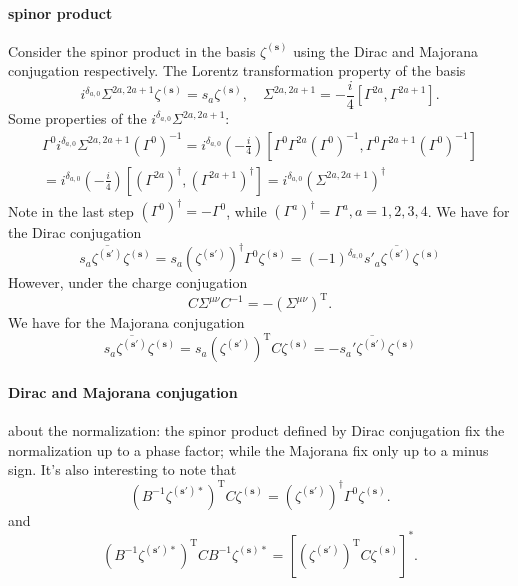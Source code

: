 
\paragraph{spinor product}
Consider the spinor product in the basis $\zeta^{(\mathbf{s})}$
using the Dirac and Majorana conjugation respectively.
The Lorentz transformation property of the basis
\[
	i^{\delta_{a,0}}\Sigma^{2a,2a+1} \zeta^{(\mathbf{s})} = s_a\zeta^{(\mathbf{s})},\quad
	\Sigma^{2a,2a+1} = -\frac{i}{4} [\Gamma^{2a},\Gamma^{2a+1}]
.\]
Some properties of the $i^{\delta_{a,0}}\Sigma^{2a,2a+1}$:
\begin{align*}
	\Gamma^0 i^{\delta_{a,0}}\Sigma^{2a,2a+1} (\Gamma^0)^{-1}
	=i^{\delta_{a,0}} (-\frac{i}{4})
	[\Gamma^0 \Gamma^{2a} (\Gamma^0)^{-1},
	\Gamma^0 \Gamma^{2a+1} (\Gamma^0)^{-1}]\\
	=i^{\delta_{a,0}} (-\frac{i}{4})
	[ (\Gamma^{2a})^\dagger ,
	(\Gamma^{2a+1})^\dagger ]
	= i^{\delta_{a,0}}(\Sigma^{2a,2a+1})^\dagger
\end{align*}
Note in the last step $(\Gamma^0)^\dagger = -\Gamma^0$, while
$(\Gamma^a)^\dagger = \Gamma^a,a=1,2,3,4$.
We have for the Dirac conjugation
\begin{equation}
	s_a \overline{\zeta^{(\mathbf{s}')}}\zeta^{(\mathbf{s})}
	= s_a (\zeta^{(\mathbf{s}')})^{\dagger} \Gamma^0 \zeta^{(\mathbf{s})}
	=(-1)^{\delta_{a,0}}s'_a \overline{\zeta^{(\mathbf{s}')}}\zeta^{(\mathbf{s})}
\end{equation}
However, under the charge conjugation
\[
	C \Sigma^{\mu\nu} C^{-1} = - (\Sigma^{\mu\nu})^{\text{T}}
.\] 
We have for the Majorana conjugation
\begin{equation}
s_a \overline{\zeta^{(\mathbf{s}')}}	\zeta^{(\mathbf{s})}
= s_a (\zeta^{(\mathbf{s}')})^{\text{T}} C \zeta^{(\mathbf{s})}
=- s_a'\overline{\zeta^{(\mathbf{s}')}}	\zeta^{(\mathbf{s})}
\end{equation}

\paragraph{Dirac and Majorana conjugation}
about the normalization:
the spinor product defined by Dirac conjugation fix the normalization up to a phase factor;
while the Majorana fix only up to a minus sign.
It's also interesting to note that
\[
	(B^{-1}\zeta^{(\mathbf{s}')*})^{\text{T}} C \zeta^{(\mathbf{s})}	=(\zeta^{(\mathbf{s}')})^{\dagger} \Gamma^0 \zeta^{(\mathbf{s})} 
.\] 
and
\[
	(B^{-1}\zeta^{(\mathbf{s}')*})^{\text{T}} C B^{-1}\zeta^{(\mathbf{s})*}	= \left[(\zeta^{(\mathbf{s}')})^{\text{T}} C \zeta^{(\mathbf{s})}\right]^*
.\] 
